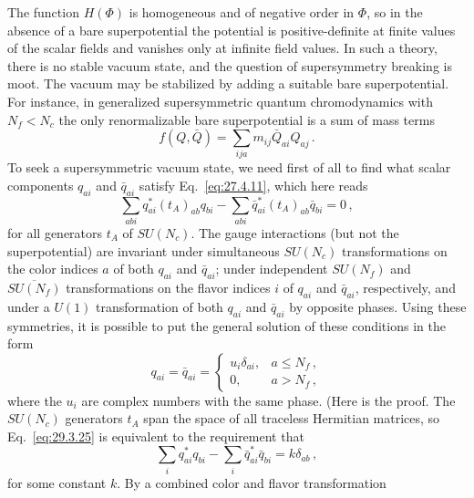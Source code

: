 The function \(H(\Phi)\) is homogeneous and of negative order in \(\Phi\),
so in the absence of a bare superpotential the potential is
positive-definite at finite values of the scalar fields and vanishes only
at infinite field values. In such a theory, there is no stable vacuum
state, and the question of supersymmetry breaking is moot. The vacuum may
be stabilized by adding a suitable bare superpotential. For instance, in
generalized supersymmetric quantum chromodynamics with \(N_f<N_c\) the
only renormalizable bare superpotential is a sum of mass terms
\begin{equation}
  f(Q,\bar Q)=\sum_{ija}m_{ij}\bar Q_{ai}Q_{aj}\,.
  \tag{29.3.24}\label{eq:29.3.24}
\end{equation}
To seek a supersymmetric vacuum state, we need first of all to find what
scalar components \(q_{ai}\) and \(\bar q_{ai}\) satisfy
Eq.~\eqref{eq:27.4.11}, which here reads
\begin{equation}
  \sum_{abi}q_{ai}^*(t_A)_{ab}q_{bi}
  -
  \sum_{abi}\bar q_{ai}^*(t_A)_{ab}\bar q_{bi}
  =0\,,
  \tag{29.3.25}\label{eq:29.3.25}
\end{equation}
for all generators \(t_A\) of \(SU(N_c)\). The gauge interactions (but
not the superpotential) are invariant under simultaneous \(SU(N_c)\)
transformations on the color indices \(a\) of both \(q_{ai}\) and
\(\bar q_{ai}\); under independent \(SU(N_f)\) and
\(\overline{SU(N_f)}\) transformations on the flavor indices \(i\) of
\(q_{ai}\) and \(\bar q_{ai}\), respectively, and under a \(U(1)\)
transformation of both \(q_{ai}\) and \(\bar q_{ai}\) by opposite phases.
Using these symmetries, it is possible to put the general solution of these
conditions in the form
\begin{equation}
  q_{ai}=\bar q_{ai}
  =
  \begin{cases}
    u_i\delta_{ai}, & a\leq N_f\,,\\
    0, & a>N_f\,,
  \end{cases}
  \tag{29.3.26}\label{eq:29.3.26}
\end{equation}
where the \(u_i\) are complex numbers with the same phase. (Here is the
proof. The \(SU(N_c)\) generators \(t_A\) span the space of all traceless
Hermitian matrices, so Eq.~\eqref{eq:29.3.25} is equivalent to the
requirement that
\begin{equation}
  \sum_i q_{ai}^*q_{bi}
  -
  \sum_i\bar q_{ai}^*\bar q_{bi}
  =
  k\delta_{ab}\,,
  \tag{29.3.27}\label{eq:29.3.27}
\end{equation}
for some constant \(k\). By a combined color and flavor transformation
